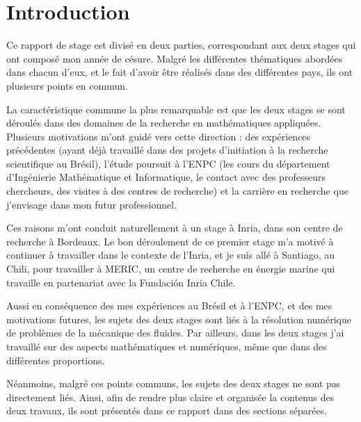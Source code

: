 \part*{Introduction}

\indent Ce rapport de stage est divisé en deux parties, correspondant aux deux stages qui ont composé mon année de césure. Malgré les différentes thématiques abordées dans chacun d'eux, et le fait d'avoir être réalisés dans des différentes pays, ils ont plusieurs points en commun.

\indent La caractéristique commune la plus remarquable est que les deux stages se sont déroulés dans des domaines de la recherche en mathématiques appliquées. Plusieurs motivations m'ont guidé vers cette direction : des expériences précédentes (ayant déjà travaillé dans des projets d'initiation à la recherche scientifique au Brésil), l'étude poursuit à l'ENPC (les cours du département d’Ingénierie Mathématique et Informatique, le contact avec des professeurs chercheurs, des visites à des centres de recherche) et la carrière en recherche que j'envisage dans mon futur professionnel.

\indent Ces raisons m'ont conduit naturellement à un stage à Inria, dans son centre de recherche à Bordeaux. Le bon déroulement de ce premier stage m'a motivé à continuer à travailler dans le contexte de l'Inria, et je suis allé à Santiago, au Chili, pour travailler à MERIC, un centre de recherche en énergie marine qui travaille en partenariat avec la Fundación Inria Chile.

\indent Aussi en conséquence des mes expériences au Brésil et à l'ENPC, et des mes motivations futures, les sujets des deux stages sont liés à la résolution numérique de problèmes de la mécanique des fluides. Par ailleurs, dans les deux stages j'ai travaillé sur des aspects mathématiques et numériques, même que dans des différentes proportions. 

\indent Néanmoins, malgré ces points communs, les sujets des deux stages ne sont pas directement liés. Ainsi, afin de rendre plus claire et organisée la contenus des deux travaux, ils sont présentés dans ce rapport dans des sections séparées.